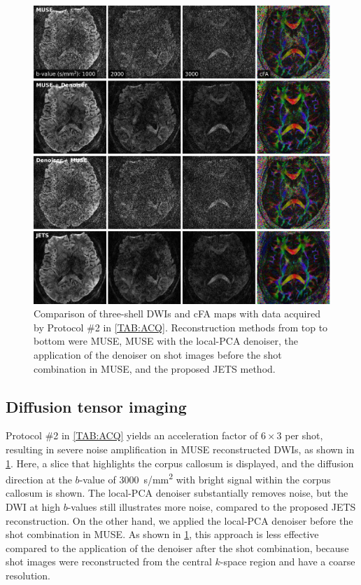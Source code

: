 \documentclass[preprint,12pt,authoryear,review]{elsarticle}
\begin{document}
    \begin{figure}
        \centering
        \includegraphics[width=\textwidth]{../figures/fig9.png}
        \caption{Comparison of three-shell DWIs and
        cFA maps with data acquired by Protocol \#2 in \cref{TAB:ACQ}.
        Reconstruction methods from top to bottom were
        MUSE, MUSE with the local-PCA denoiser,
        the application of the denoiser on shot images before the shot combination in MUSE,
        and the proposed JETS method.}
        \label{FIG:1.0mm_dti}
    \end{figure}

    \subsection{Diffusion tensor imaging}

    Protocol \#2 in \cref{TAB:ACQ} yields an acceleration factor of
    $6 \times 3$ per shot, resulting in severe noise amplification
    in MUSE reconstructed DWIs, as shown in \cref{FIG:1.0mm_dti}.
    Here, a slice that highlights the corpus callosum is displayed,
    and the diffusion direction at the $b$-value of
    \SI{3000}{s/mm^2} with bright signal
    within the corpus callosum is shown.
    The local-PCA denoiser substantially removes noise,
    but the DWI at high $b$-values still illustrates more noise,
    compared to the proposed JETS reconstruction.
    On the other hand, we applied the local-PCA denoiser
    before the shot combination in MUSE.
    As shown in \cref{FIG:1.0mm_dti},
    this approach is less effective
    compared to the application of the denoiser after the shot combination,
    because shot images were reconstructed from the central $k$-space region
    and have a coarse resolution.
\end{document}
